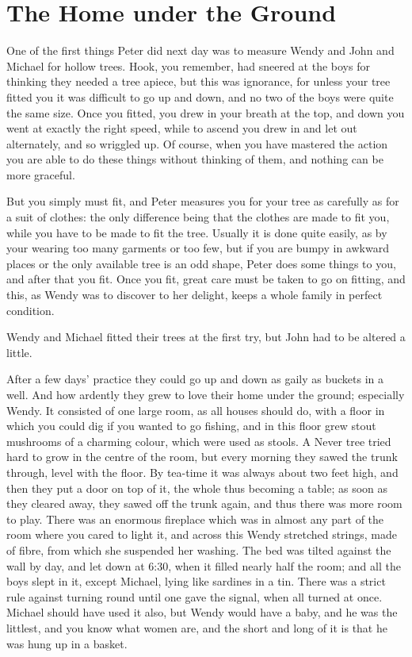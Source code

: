 
\chapter{The Home under the Ground}

One of the first things Peter did next day was to measure Wendy and John and Michael for hollow trees.
Hook, you remember, had sneered at the boys for thinking they needed a tree apiece,
but this was ignorance, for unless your tree fitted you it was difficult to go up and down,
and no two of the boys were quite the same size.
Once you fitted, you drew in your breath at the top, and down you went at exactly the right speed,
while to ascend you drew in and let out alternately, and so wriggled up.
Of course, when you have mastered the action you are able to do these things without thinking of them,
and nothing can be more graceful.

But you simply must fit, and Peter measures you for your tree as carefully as for a suit of clothes:
the only difference being that the clothes are made to fit you, while you have to be made to fit the tree.
Usually it is done quite easily, as by your wearing too many garments or too few,
but if you are bumpy in awkward places or the only available tree is an odd shape,
Peter does some things to you, and after that you fit.
Once you fit, great care must be taken to go on fitting,
and this, as Wendy was to discover to her delight, keeps a whole family in perfect condition.

Wendy and Michael fitted their trees at the first try, but John had to be altered a little.

After a few days’ practice they could go up and down as gaily as buckets in a well.
And how ardently they grew to love their home under the ground;
especially Wendy.
It consisted of one large room, as all houses should do,
with a floor in which you could dig if you wanted to go fishing,
and in this floor grew stout mushrooms of a charming colour, which were used as stools.
A Never tree tried hard to grow in the centre of the room,
but every morning they sawed the trunk through, level with the floor.
By tea-time it was always about two feet high, and then they put a door on top of it,
the whole thus becoming a table;
as soon as they cleared away, they sawed off the trunk again, and thus there was more room to play.
There was an enormous fireplace which was in almost any part of the room where you cared to light it,
and across this Wendy stretched strings, made of fibre, from which she suspended her washing.
The bed was tilted against the wall by day, and let down at 6:30, when it filled nearly half the room;
and all the boys slept in it, except Michael, lying like sardines in a tin.
There was a strict rule against turning round until one gave the signal, when all turned at once.
Michael should have used it also, but Wendy would have a baby, and he was the littlest,
and you know what women are, and the short and long of it is that he was hung up in a basket.

